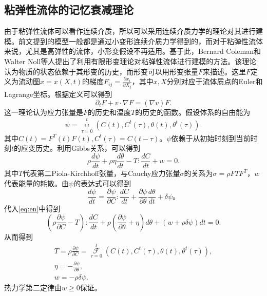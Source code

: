 \subsection{粘弹性流体的记忆衰减理论}
由于粘弹性流体可以看作连续介质，所以可以采用连续介质力学的理论对其进行建模。前文提到的模型一般都是通过小变形连续介质力学得到的，而对于粘弹性流体来说，尤其是高弹性的流体，小形变假设不再适用。基于此，Bernard Coleman和Walter Noll等人提出了利用有限形变理论对粘弹性流体进行建模的方法\cite{coleman1961foundations,coleman1964thermodynamics,coleman2012viscometric}。该理论认为物质的状态依赖于其形变的历史，而形变可以用形变张量$F$来描述。这里$F$定义为流动图$x = x(X,t)$的梯度$F_{ij} = \frac{\partial x_i}{\partial X_j}$，其中$x,X$分别对应于流体质点的Euler和Lagrange坐标。根据定义可以得到
\begin{equation}\label{eq:Feq}
	\partial_t F + v \cdot \nabla F = (\nabla v) F.
\end{equation}
这一理论认为应力张量是$F$的历史和温度$T$的历史的函数。假设体系的自由能为
\begin{equation*}
	\psi = \mathop{\psi} \limits_{\tau=0}^{t}( C(t), C^t(\tau),\theta(t),\theta^t(\tau)).
\end{equation*}
其中$C(t) = F^T(t) F(t),C^t(\tau) = C(t - \tau)$。$\psi$依赖于从初始时刻到当前时刻$t$的应变历史。利用Gibbs关系，可以得到
\begin{equation}\label{eq:en}
	\rho \frac{d\psi}{dt} + \rho \eta \frac{d \theta}{dt} - T: \frac{dC}{dt} + w = 0.
\end{equation}
其中$T$代表第二Piola-Kirchhoff张量，与Cauchy应力张量$\sigma$的关系为$\sigma = \rho F T F^T$，$w$代表能量的耗散。由$\psi$的表达式可以得到
\begin{equation*}
	\frac{d\psi}{dt} = \frac{\partial \psi}{\partial C} : \frac{d C}{dt}+ \frac{\partial \psi}{\partial \theta} \frac{d\theta}{dt} + \delta \psi。
\end{equation*}
代入\eqref{eq:en}中得到
\begin{equation*}
	(\rho \frac{\partial \psi}{\partial C} - T) : \frac{dC}{dt} + \rho (\frac{\partial \psi}{\partial \theta} + \eta) d\theta + (w + \rho \delta \psi) dt  =0.
\end{equation*}
从而得到
\begin{eqnarray*}
	T = \rho \frac{\partial \psi}{\partial C} = \mathop{\mathcal{F}}\limits_{\tau=0}^{t} ( C(t), C^t(\tau),\theta(t),\theta^t(\tau)), \\
	\eta = -\frac{\partial \psi}{\partial \theta},\\
	w = -\rho \delta \psi.
\end{eqnarray*}
热力学第二定律由$w \ge 0$保证\cite{coleman1961foundations,dimitrienko2010nonlinear}。

